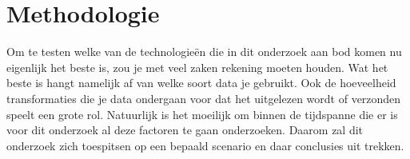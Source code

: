 
\chapter{Methodologie}
\label{ch:methodologie}




Om te testen welke van de technologieën die in dit onderzoek aan bod komen nu eigenlijk het beste is, zou je met veel zaken rekening moeten houden. Wat het beste is hangt namelijk af van welke soort data je gebruikt. Ook de hoeveelheid transformaties die je data ondergaan voor dat het uitgelezen wordt of verzonden speelt een grote rol. Natuurlijk is het moeilijk om binnen de tijdspanne die er is voor dit onderzoek al deze factoren te gaan onderzoeken. Daarom zal dit onderzoek zich toespitsen op een bepaald scenario en daar conclusies uit trekken.  
